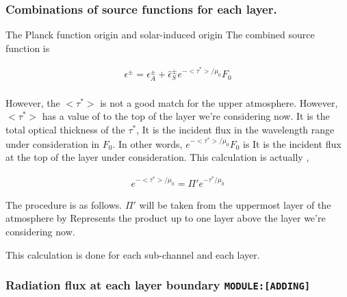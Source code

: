 \hypertarget{combinations-of-source-functions-for-each-layer.}{%
\subsubsection{Combinations of source functions for each
layer.}\label{combinations-of-source-functions-for-each-layer.}}

The Planck function origin and solar-induced origin The combined source
function is

\begin{eqnarray}
  \epsilon^\pm  = 
  \epsilon_A^\pm + \hat{\epsilon}_S^\pm e^{-<\tau^*>/\mu_0} F_0 \\
\end{eqnarray}

However, the \(<\tau^*>\) is not a good match for the upper atmosphere.
However, \(<\tau^*>\) has a value of to the top of the layer we're
considering now. It is the total optical thickness of the \(\tau^*\), It
is the incident flux in the wavelength range under consideration in
\(F_0\). In other words, \(e^{-<\tau^*>/\mu_0} F_0\) is It is the
incident flux at the top of the layer under consideration. This
calculation is actually ,

\begin{eqnarray}
  e^{-<\tau^*>/\mu_0} = \Pi' e^{-\tau^*/\mu_0}
\end{eqnarray}

The procedure is as follows. \(\Pi'\) will be taken from the uppermost
layer of the atmosphere by Represents the product up to one layer above
the layer we're considering now.

This calculation is done for each sub-channel and each layer.

\hypertarget{radiation-flux-at-each-layer-boundary-moduleadding}{%
\subsubsection{\texorpdfstring{Radiation flux at each layer boundary
\texttt{MODULE:{[}ADDING{]}}}{Radiation flux at each layer boundary MODULE:{[}ADDING{]}}}\label{radiation-flux-at-each-layer-boundary-moduleadding}}

